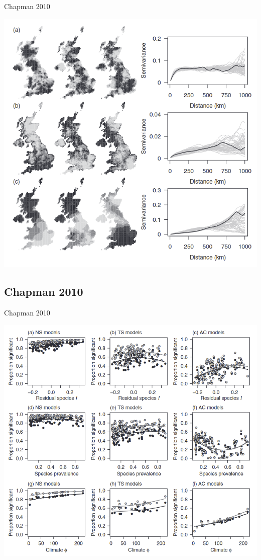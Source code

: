 \documentclass[
  ignorenonframetext,
]{beamer}
\begin{document}
\begin{frame}{Chapman 2010}
\small

\includegraphics[width=\textwidth,height=0.9\textheight]{chap_sims.png}
\end{frame}

\hypertarget{chapman-2010-2}{%
\subsection{Chapman 2010}\label{chapman-2010-2}}

\begin{frame}{Chapman 2010}
\small

\includegraphics[width=\textwidth,height=0.9\textheight]{chap_single.png}
\end{frame}
\end{document}
